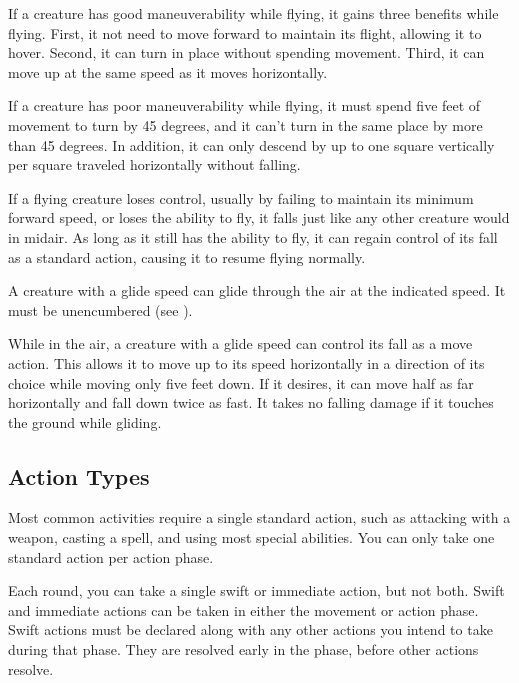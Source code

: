              If a creature has good maneuverability while flying, it gains three benefits while flying.
            First, it not need to move forward to maintain its flight, allowing it to hover.
            Second, it can turn in place without spending movement.
            Third, it can move up at the same speed as it moves horizontally.

             If a creature has poor maneuverability while flying, it must spend five feet of movement to turn by 45 degrees, and it can't turn in the same place by more than 45 degrees. In addition, it can only descend by up to one square vertically per square traveled horizontally without falling.

             If a flying creature loses control, usually by failing to maintain its minimum forward speed, or loses the ability to fly, it falls just like any other creature would in midair. As long as it still has the ability to fly, it can regain control of its fall as a standard action, causing it to resume flying normally.

            \label{Gliding}
            A creature with a glide speed can glide through the air at the indicated speed. It must be unencumbered (see ).

            While in the air, a creature with a glide speed can control its fall as a move action. This allows it to move up to its speed horizontally in a direction of its choice while moving only five feet down. If it desires, it can move half as far horizontally and fall down twice as fast. It takes no falling damage if it touches the ground while gliding.

    \subsection{Action Types}

         Most common activities require a single standard action, such as attacking with a weapon, casting a spell, and using most special abilities.
        You can only take one standard action per action phase.

        \label{Swift and Immediate Actions} Each round, you can take a single swift or immediate action, but not both.
        Swift and immediate actions can be taken in either the movement or action phase.
        Swift actions must be declared along with any other actions you intend to take during that phase.
        They are resolved early in the phase, before other actions resolve.

